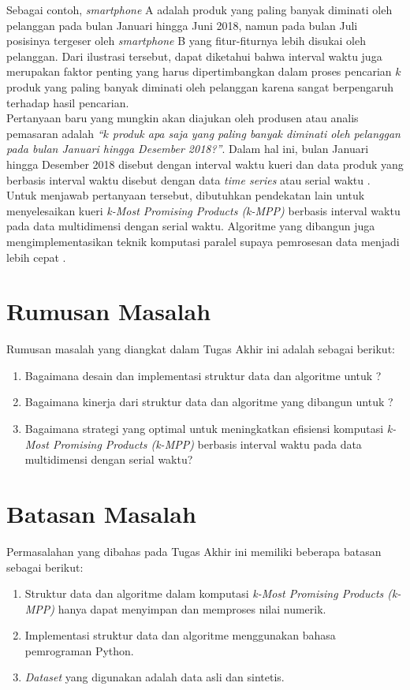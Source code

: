 \tab Sebagai contoh, \textit{smartphone} A adalah produk yang paling banyak diminati oleh pelanggan pada bulan Januari hingga Juni 2018, namun pada bulan Juli posisinya tergeser oleh \textit{smartphone} B yang fitur-fiturnya lebih disukai oleh pelanggan. Dari ilustrasi tersebut, dapat diketahui bahwa interval waktu juga merupakan faktor penting yang harus dipertimbangkan dalam proses pencarian $k$ produk yang paling banyak diminati oleh pelanggan karena sangat berpengaruh terhadap hasil pencarian.\\
\tab Pertanyaan baru yang mungkin akan diajukan oleh produsen atau analis
pemasaran adalah \textit{“$k$ produk apa saja yang paling banyak diminati oleh pelanggan pada bulan Januari hingga Desember 2018?”}. Dalam hal ini, bulan Januari hingga Desember 2018 disebut dengan interval waktu kueri dan data produk yang berbasis interval waktu disebut dengan data \textit{time series} atau serial waktu \cite{time-series}.\\
\tab Untuk menjawab pertanyaan tersebut, dibutuhkan pendekatan lain untuk menyelesaikan kueri \textit{k-Most Promising Products (k-MPP)} berbasis interval waktu pada data multidimensi dengan serial waktu. Algoritme yang dibangun juga mengimplementasikan teknik komputasi paralel supaya pemrosesan data menjadi lebih cepat \cite{kmpp}.

\section{Rumusan Masalah}
\tab Rumusan masalah yang diangkat dalam Tugas Akhir ini adalah sebagai berikut:
\begin{enumerate}
	\item Bagaimana desain dan implementasi struktur data dan algoritme untuk \problem?
	\item Bagaimana kinerja dari struktur data dan algoritme yang dibangun untuk \problem?
	\item Bagaimana strategi yang optimal untuk meningkatkan efisiensi komputasi \textit{k-Most Promising Products (k-MPP)} berbasis interval waktu pada data multidimensi dengan serial waktu?
\end{enumerate}

\section{Batasan Masalah}
\tab Permasalahan yang dibahas pada Tugas Akhir ini memiliki beberapa batasan sebagai berikut:
\begin{enumerate}
	\item Struktur data dan algoritme dalam komputasi \textit{k-Most Promising Products (k-MPP)} hanya dapat menyimpan dan memproses nilai numerik.
	\item Implementasi struktur data dan algoritme menggunakan bahasa pemrograman Python.
	\item \textit{Dataset} yang digunakan adalah data asli dan sintetis.
\end{enumerate}

